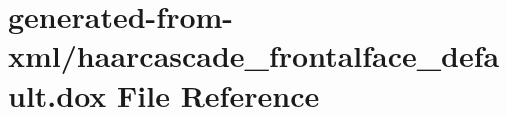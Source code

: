 \hypertarget{haarcascade__frontalface__default_8dox}{}\section{generated-\/from-\/xml/haarcascade\+\_\+frontalface\+\_\+default.dox File Reference}
\label{haarcascade__frontalface__default_8dox}
